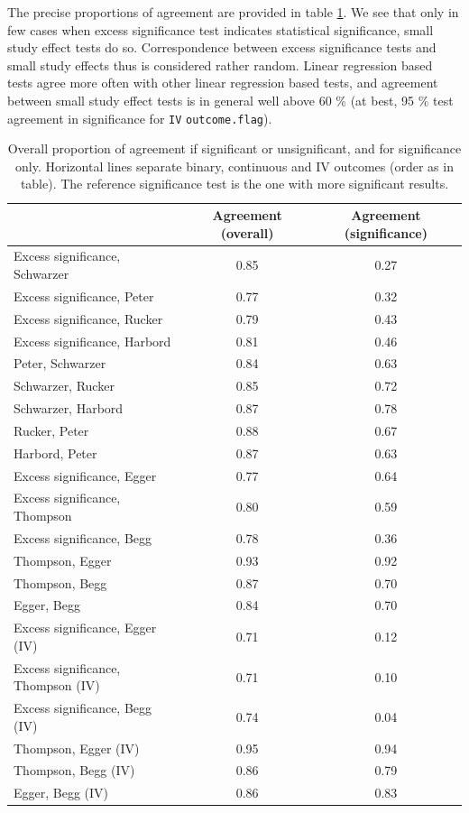\documentclass[11pt,a4paper,twoside]{book}\usepackage[]{graphicx}\usepackage[]{color}
\begin{document}
The precise proportions of agreement are provided in table \ref{test.agreement}. We see that only in few cases when excess significance test indicates statistical significance, small study effect tests do so. Correspondence between excess significance tests and small study effects thus is considered rather random. Linear regression based tests agree more often with other linear regression based tests, and agreement between small study effect tests is in general well above 60 \% (at best, 95 \% test agreement in significance for \texttt{IV} \texttt{outcome.flag}).

\begin{table}[ht]
\centering
\begingroup\scriptsize
\begin{tabular}{lcc}
  \hline
 & Agreement (overall) & Agreement (significance) \\ 
  \hline
Excess significance, Schwarzer & 0.85 & 0.27 \\ 
  Excess significance, Peter & 0.77 & 0.32 \\ 
  Excess significance, Rucker & 0.79 & 0.43 \\ 
  Excess significance, Harbord & 0.81 & 0.46 \\ 
  Peter, Schwarzer & 0.84 & 0.63 \\ 
  Schwarzer, Rucker & 0.85 & 0.72 \\ 
  Schwarzer, Harbord & 0.87 & 0.78 \\ 
  Rucker, Peter & 0.88 & 0.67 \\ 
  Harbord, Peter & 0.87 & 0.63 \\ 
  Excess significance, Egger & 0.77 & 0.64 \\ 
  Excess significance, Thompson & 0.80 & 0.59 \\ 
  Excess significance, Begg & 0.78 & 0.36 \\ 
  Thompson, Egger & 0.93 & 0.92 \\ 
  Thompson, Begg & 0.87 & 0.70 \\ 
  Egger, Begg & 0.84 & 0.70 \\ 
  Excess significance, Egger (IV) & 0.71 & 0.12 \\ 
  Excess significance, Thompson (IV) & 0.71 & 0.10 \\ 
  Excess significance, Begg (IV) & 0.74 & 0.04 \\ 
  Thompson, Egger (IV) & 0.95 & 0.94 \\ 
  Thompson, Begg (IV) & 0.86 & 0.79 \\ 
  Egger, Begg (IV) & 0.86 & 0.83 \\ 
   \hline
\end{tabular}
\endgroup
\caption{Overall proportion of agreement if significant or unsignificant, and for significance only. Horizontal lines separate binary, continuous and IV outcomes (order as in table). The reference significance test is the one with more significant results.} 
\label{test.agreement}
\end{table}
\end{document}
